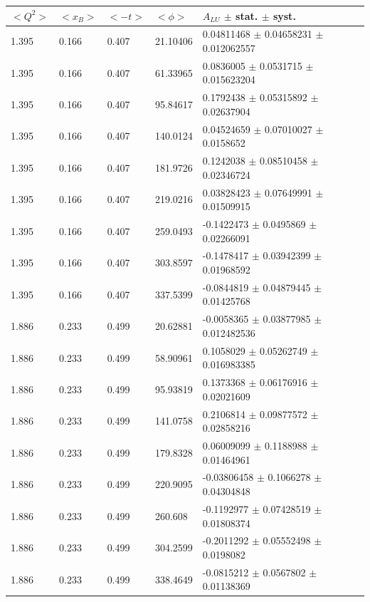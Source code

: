 \begin{table}[!h]
   \begin{center}
      \begin{tabular}{||l|l|l|l|l||}
         \hline
 $<Q^{2}>$ & $<x_{B}>$ & $<-t>$ & $<\phi>$ & $A_{LU}$ $\pm$ stat. $\pm$ syst.\\
 \hline  1.395 & 0.166 & 0.407  &   21.10406  &  0.04811468 $\pm$  0.04658231  
         $\pm$  0.012062557     \\
  1.395 & 0.166 & 0.407  &   61.33965  &  0.0836005  $\pm$  0.0531715   $\pm$  0.015623204     \\
  1.395 & 0.166 & 0.407  &   95.84617  &  0.1792438  $\pm$  0.05315892  $\pm$  0.02637904      \\
  1.395 & 0.166 & 0.407  &   140.0124  &  0.04524659 $\pm$  0.07010027  $\pm$  0.0158652       \\
  1.395 & 0.166 & 0.407  &   181.9726  &  0.1242038  $\pm$  0.08510458  $\pm$  0.02346724      \\
  1.395 & 0.166 & 0.407  &   219.0216  &  0.03828423 $\pm$  0.07649991  $\pm$  0.01509915      \\
  1.395 & 0.166 & 0.407  &   259.0493  &  -0.1422473 $\pm$  0.0495869   $\pm$  0.02266091      \\
  1.395 & 0.166 & 0.407  &   303.8597  &  -0.1478417 $\pm$  0.03942399  $\pm$  0.01968592      \\
  1.395 & 0.166 & 0.407  &   337.5399  &  -0.0844819 $\pm$  0.04879445  $\pm$  
 0.01425768      \\
 \hline                                                                      
 1.886 & 0.233 & 0.499 &    20.62881  &  -0.0058365 $\pm$  0.03877985  $\pm$  
 0.012482536     \\
  1.886 & 0.233 & 0.499 &    58.90961  &  0.1058029  $\pm$  0.05262749  $\pm$  0.016983385     \\
  1.886 & 0.233 & 0.499 &    95.93819  &  0.1373368  $\pm$  0.06176916  $\pm$  0.02021609      \\
  1.886 & 0.233 & 0.499 &    141.0758  &  0.2106814  $\pm$  0.09877572  $\pm$  0.02858216      \\
  1.886 & 0.233 & 0.499 &    179.8328  &  0.06009099 $\pm$  0.1188988   $\pm$  0.01464961      \\
  1.886 & 0.233 & 0.499 &    220.9095  &  -0.03806458 $\pm$  0.1066278   $\pm$  
 0.04304848      \\
  1.886 & 0.233 & 0.499 &    260.608   &  -0.1192977 $\pm$  0.07428519  $\pm$  0.01808374      \\
  1.886 & 0.233 & 0.499 &    304.2599  &  -0.2011292 $\pm$  0.05552498  $\pm$  0.0198082       \\
  1.886 & 0.233 & 0.499 &    338.4649  &  -0.0815212 $\pm$  0.0567802   $\pm$  0.01138369      \\
 \hline
                                                                      

\end{tabular}
\end{center}
\end{table}
